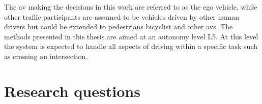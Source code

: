 
The \gls{av} making the decisions in this work are referred to as the ego vehicle, while other traffic participants are assumed to be vehicles driven by other human drivers but could be extended to pedestrians bicyclist and other \gls{av}s. 
The methods presented in this thesis are aimed at an autonomy level L5. At this level the system is expected to handle all aspects of driving within a specific task such as crossing an intersection. 




\section{Research questions}
\label{sec:research_questions}


	
